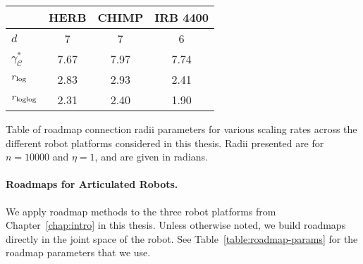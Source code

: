 \begin{margintable}
   \centering
   {\renewcommand{\tabcolsep}{0.15cm}
   \begin{tabular}{lccc}
      \toprule
      & HERB & CHIMP & IRB 4400 \\
      \midrule
      $d$ & 7 & 7 & 6 \\
      $\gamma^*_{\mathcal{C}}$ & 7.67 & 7.97 & 7.74 \\
      $r_{\mbox{\scriptsize log}}$ & 2.83 & 2.93 & 2.41 \\
      $r_{\mbox{\scriptsize loglog}}$ & 2.31 & 2.40 & 1.90 \\
      \bottomrule
   \end{tabular}
   }
   \vspace{0.1cm}
   \caption{Table of roadmap connection radii parameters for
      various scaling rates across the different robot platforms
      considered in this thesis.
      Radii presented are for $n=10000$ and $\eta = 1$,
      and are given in radians.}
   \label{table:roadmap-params}
\end{margintable}

\paragraph{Roadmaps for Articulated Robots.}
We apply roadmap methods to the three robot platforms
from Chapter~\ref{chap:intro} in this thesis.
Unless otherwise noted,
we build roadmaps directly in the joint space of the robot.
See Table~\ref{table:roadmap-params} for the roadmap parameters
that we use.

%
%
%
%

